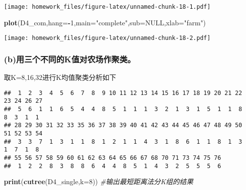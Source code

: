\documentclass[
]{article}
\newenvironment{Shaded}{\begin{snugshade}}{\end{snugshade}}
\newcommand{\CommentTok}[1]{\textcolor[rgb]{0.56,0.35,0.01}{\textit{#1}}}
\newcommand{\DataTypeTok}[1]{\textcolor[rgb]{0.13,0.29,0.53}{#1}}
\newcommand{\DecValTok}[1]{\textcolor[rgb]{0.00,0.00,0.81}{#1}}
\newcommand{\KeywordTok}[1]{\textcolor[rgb]{0.13,0.29,0.53}{\textbf{#1}}}
\newcommand{\NormalTok}[1]{#1}
\newcommand{\OperatorTok}[1]{\textcolor[rgb]{0.81,0.36,0.00}{\textbf{#1}}}
\newcommand{\OtherTok}[1]{\textcolor[rgb]{0.56,0.35,0.01}{#1}}
\newcommand{\StringTok}[1]{\textcolor[rgb]{0.31,0.60,0.02}{#1}}
\begin{document}
\texttt{[image: homework\_files/figure-latex/unnamed-chunk-18-1.pdf]}

\begin{Shaded}
\begin{Highlighting}[]
\KeywordTok{plot}\NormalTok{(D4_com,}\DataTypeTok{hang=}\OperatorTok{-}\DecValTok{1}\NormalTok{,}\DataTypeTok{main=}\StringTok{"complete"}\NormalTok{,}\DataTypeTok{sub=}\OtherTok{NULL}\NormalTok{,}\DataTypeTok{xlab=}\StringTok{"farm"}\NormalTok{)}
\end{Highlighting}
\end{Shaded}

\texttt{[image: homework\_files/figure-latex/unnamed-chunk-18-2.pdf]}

\hypertarget{bux7528ux4e09ux4e2aux4e0dux540cux7684kux503cux5bf9ux519cux573aux4f5cux805aux7c7b}{%
\subsubsection{(b)用三个不同的K值对农场作聚类。}\label{bux7528ux4e09ux4e2aux4e0dux540cux7684kux503cux5bf9ux519cux573aux4f5cux805aux7c7b}}

取K=8,16,32进行K均值聚类分析如下

\begin{Shaded}
\end{Shaded}

\begin{verbatim}
##  1  2  3  4  5  6  7  8  9 10 11 12 13 14 15 16 17 18 19 20 21 22 23 24 26 27 
##  5  6  1  1  6  5  4  4  8  5  1  1  1  3  2  1  3  1  5  1  1  8  8  3  1  1 
## 28 29 30 31 32 33 35 36 37 38 39 40 41 42 43 44 45 46 47 48 49 50 51 52 53 54 
##  3  3  7  1  3  1  1  8  1  2  1  1  4  3  1  8  6  1  1  8  1  3  1  7  1  8 
## 55 56 57 58 59 60 61 62 63 64 65 66 67 68 70 71 73 74 75 76 
##  1  2  2  8  3  8  8  6  4  4  8  5  1  4  3  2  5  5  5  6
\end{verbatim}

\begin{Shaded}
\begin{Highlighting}[]
\KeywordTok{print}\NormalTok{(}\KeywordTok{cutree}\NormalTok{(D4_single,}\DataTypeTok{k=}\DecValTok{8}\NormalTok{))  }\CommentTok{#输出最短距离法分K组的结果}
\end{Highlighting}
\end{Shaded}
\end{document}

